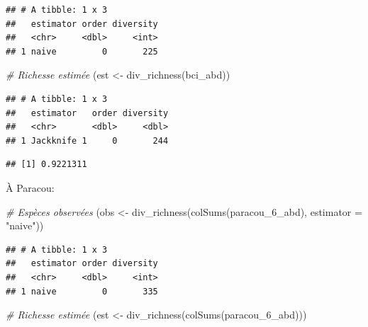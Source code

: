 \documentclass[
  11pt,
  american,
  a4paper,
  extrafontsizes,onecolumn,openright
  ]{memoir}
\newenvironment{Shaded}{\begin{snugshade}}{\end{snugshade}}
\newcommand{\AttributeTok}[1]{\textcolor[rgb]{0.77,0.63,0.00}{#1}}
\newcommand{\CommentTok}[1]{\textcolor[rgb]{0.56,0.35,0.01}{\textit{#1}}}
\newcommand{\FunctionTok}[1]{\textcolor[rgb]{0.00,0.00,0.00}{#1}}
\newcommand{\NormalTok}[1]{#1}
\newcommand{\OtherTok}[1]{\textcolor[rgb]{0.56,0.35,0.01}{#1}}
\newcommand{\SpecialCharTok}[1]{\textcolor[rgb]{0.00,0.00,0.00}{#1}}
\newcommand{\StringTok}[1]{\textcolor[rgb]{0.31,0.60,0.02}{#1}}
\begin{document}
\begin{verbatim}
## # A tibble: 1 x 3
##   estimator order diversity
##   <chr>     <dbl>     <int>
## 1 naive         0       225
\end{verbatim}

\begin{Shaded}
\begin{Highlighting}[]
\CommentTok{\# Richesse estimée}
\NormalTok{(est }\OtherTok{\textless{}{-}} \FunctionTok{div\_richness}\NormalTok{(bci\_abd))}
\end{Highlighting}
\end{Shaded}

\begin{verbatim}
## # A tibble: 1 x 3
##   estimator   order diversity
##   <chr>       <dbl>     <dbl>
## 1 Jackknife 1     0       244
\end{verbatim}

\begin{Shaded}
\end{Shaded}

\begin{verbatim}
## [1] 0.9221311
\end{verbatim}

\normalsize

À Paracou:

\scriptsize

\begin{Shaded}
\begin{Highlighting}[]
\CommentTok{\# Espèces observées}
\NormalTok{(obs }\OtherTok{\textless{}{-}} \FunctionTok{div\_richness}\NormalTok{(}\FunctionTok{colSums}\NormalTok{(paracou\_6\_abd), }\AttributeTok{estimator  =} \StringTok{"naive"}\NormalTok{))}
\end{Highlighting}
\end{Shaded}

\begin{verbatim}
## # A tibble: 1 x 3
##   estimator order diversity
##   <chr>     <dbl>     <int>
## 1 naive         0       335
\end{verbatim}

\begin{Shaded}
\begin{Highlighting}[]
\CommentTok{\# Richesse estimée}
\NormalTok{(est }\OtherTok{\textless{}{-}} \FunctionTok{div\_richness}\NormalTok{(}\FunctionTok{colSums}\NormalTok{(paracou\_6\_abd)))}
\end{Highlighting}
\end{Shaded}
\end{document}
